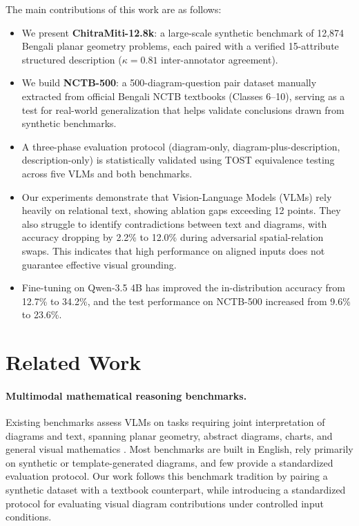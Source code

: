 \documentclass[11pt]{article}
\begin{document}
The main contributions of this work are as follows:
\begin{itemize}
\item We present \textbf{ChitraMiti-12.8k}: a large-scale synthetic benchmark of 12,874 Bengali planar geometry problems, each paired with a verified 15-attribute structured description ($\kappa=0.81$ inter-annotator agreement).
\item We build \textbf{NCTB-500}: a 500-diagram-question pair dataset manually extracted from official Bengali NCTB textbooks (Classes 6--10), serving as a test for real-world generalization that helps validate conclusions drawn from synthetic benchmarks.
\item A three-phase evaluation protocol (diagram-only, diagram-plus-description, description-only) is statistically validated using TOST equivalence testing across five VLMs and both benchmarks.
\item Our experiments demonstrate that Vision-Language Models (VLMs) rely heavily on relational text, showing ablation gaps exceeding 12 points. They also struggle to identify contradictions between text and diagrams, with accuracy dropping by 2.2\% to 12.0\% during adversarial spatial-relation swaps. This indicates that high performance on aligned inputs does not guarantee effective visual grounding.
\item Fine-tuning on Qwen-3.5 4B has improved the in-distribution accuracy from 12.7\% to 34.2\%, and the test performance on NCTB-500 increased from 9.6\% to 23.6\%. 
\end{itemize}
\section{Related Work}
\label{sec:related}

\paragraph{Multimodal mathematical reasoning benchmarks.} Existing benchmarks assess VLMs on tasks requiring joint interpretation of diagrams and text, spanning planar geometry, abstract diagrams, charts, and general visual mathematics \citep{trinh2024solving, lu2024mathvista, seo2015solving, chen2021geoqa, lu2021iconqa, zhang2024mathverse, wang2024measuring}. Most benchmarks are built in English, rely primarily on synthetic or template-generated diagrams, and few provide a standardized evaluation protocol. Our work follows this benchmark tradition by pairing a synthetic dataset with a textbook counterpart, while introducing a standardized protocol for evaluating visual diagram contributions under controlled input conditions.
\end{document}
